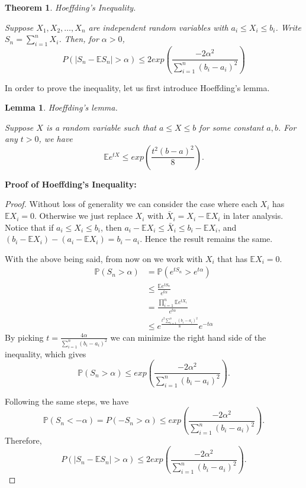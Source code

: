 \documentclass[11pt]{article}
\newtheorem{theorem}{Theorem}
\newtheorem{lemma}{Lemma}
\theoremstyle{definition}
\newcommand\PP{\mathbb{P}}
\newcommand\EE{\mathbb{E}}
\begin{document}
\begin{theorem} Hoeffding's Inequality.

Suppose $X_1,X_2,\dots,X_n$ are independent random variables with $a_i\leq X_i\leq b_i$. Write $S_n=\sum_{i=1}^n X_i$. Then, for $\alpha>0$,
$$P(|S_n-\EE S_n|>\alpha)\leq 2 exp(\frac{-2\alpha^2}{\sum_{i=1}^n(b_i-a_i)^2})$$
\end{theorem}
In order to prove the inequality, let us first introduce Hoeffding's lemma.
\begin{lemma}Hoeffding's lemma.

Suppose $X$ is a random variable such that $a\leq X\leq b$ for some constant $a,b$. For any $t>0$, we have
$$\EE e^{tX}\leq exp(\frac{t^2(b-a)^2}{8}).$$
\end{lemma}
\noindent\textbf{Proof of Hoeffding's Inequality:}
\begin{proof}
Without loss of generality we can consider the case where each $X_i$ has $\EE X_i=0$. Otherwise we just replace $X_i$ with $\bar{X}_i=X_i-\EE X_i$ in later analysis. Notice that if $a_i\leq X_i \leq b_i$, then $a_i-\EE X_i \leq \bar{X}_i\leq b_i-\EE X_i$, and  $(b_i-\EE X_i)-(a_i-\EE X_i )=b_i-a_i$. Hence the result remains the same.

With the above being said, from now on we work with $X_i$ that has $\EE X_i=0$. 
\begin{align*}
\PP(S_n>\alpha)&=\PP(e^{tS_n}>e^{t\alpha})\\
&\leq \frac{\EE e^{tS_n}}{e^{t\alpha}}\\
&=\frac{\prod_{i=1}^n \EE e^{tX_i}}{e^{t\alpha}} \\
&\leq e^{\frac{t^2\sum_{i=1}^n(b_i-a_i)^2}{8}}e^{-t\alpha} 
\end{align*}
By picking $t=\frac{4\alpha}{\sum_{i=1}^n(b_i-a_i)^2}$ we can minimize the right hand side of the inequality, which gives
$$\PP(S_n>\alpha)\leq  exp(\frac{-2\alpha^2}{\sum_{i=1}^n(b_i-a_i)^2}).$$

Following the same steps, we have 
$$\PP(S_n<-\alpha)=P(-S_n>\alpha)\leq  exp(\frac{-2\alpha^2}{\sum_{i=1}^n(b_i-a_i)^2}).$$
Therefore,
$$P(|S_n-\EE S_n|>\alpha)\leq 2 exp(\frac{-2\alpha^2}{\sum_{i=1}^n(b_i-a_i)^2}).$$
\end{proof}
\end{document}
